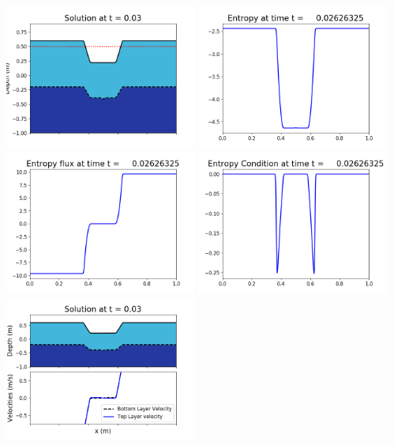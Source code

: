 \documentclass[11pt]{article}
\begin{document}
\includegraphics[width=0.475\textwidth]{frame0073fig1006.png}
\vskip 10pt 
\includegraphics[width=0.475\textwidth]{frame0073fig1007.png}
\includegraphics[width=0.475\textwidth]{frame0073fig1008.png}
\vskip 10pt 
\includegraphics[width=0.475\textwidth]{frame0073fig1009.png}
\vskip 10pt 
\includegraphics[width=0.475\textwidth]{frame0074fig1001.png}
\end{document}
